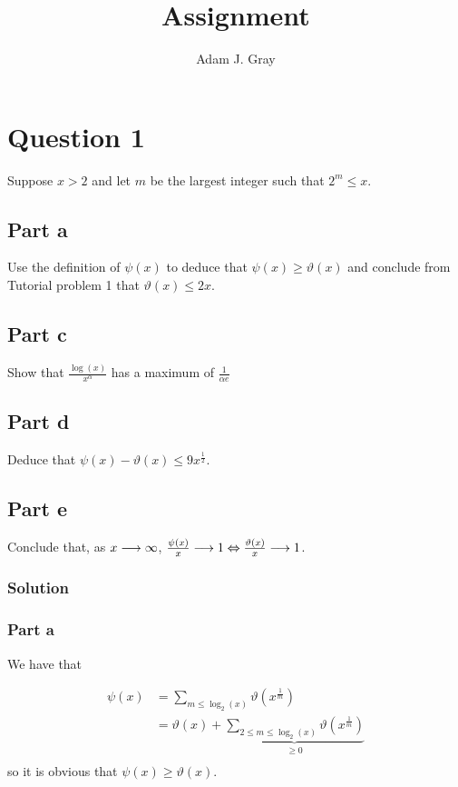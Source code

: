 \documentclass{unswmaths}
\begin{document}
\author{Adam J. Gray}
\subject{Number Theory}
\title{Assignment}

\unswtitle

\section*{Question 1}

Suppose $ x > 2 $ and let $ m $ be the largest integer such that $ 2^m \leq x $.

\subsection*{Part a}
Use the definition of $ \psi(x) $ to deduce that $ \psi(x) \geq \vartheta(x) $ and conclude from Tutorial problem 1 that
$ \vartheta(x) \leq 2x $.

\subsection*{Part c}

Show that $ \frac{\log(x) }{x^\alpha} $ has a maximum of $ \frac{1}{\alpha e} $

\subsection*{Part d}

Deduce that $ \psi(x) - \vartheta(x) \leq 9x^\frac{1}{2} $.

\subsection*{Part e}

Conclude that, as $ x \longrightarrow \infty $, $ \frac{\psi(x)}{x} \longrightarrow 1 \Leftrightarrow \frac{\vartheta(x)}{x} \longrightarrow 1 $.

\subsubsection*{Solution}

\subsubsection*{Part a}

We have that 

\begin{align*}
	\psi(x) &= \sum_{m \leq \log_2(x)} \vartheta(x^\frac{1}{m}) \\
		&= \vartheta(x) + \underbrace{\sum_{2 \leq m \leq \log_2(x)} \vartheta(x^\frac{1}{m})}_{\geq 0} \\
\end{align*}
so it is obvious that $ \psi(x) \geq \vartheta(x) $.
\end{document}

